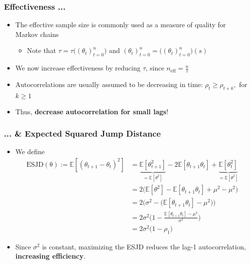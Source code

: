 \begin{frame}[c]
    \frametitle{Effectiveness ...}
    \begin{itemize}
        \item The effective sample size is commonly used as a measure of quality for Markov chains
        \begin{itemize}
            \item Note that $\tau = \tau\big((\theta_t)_{t=0}^n\big)$ and $(\theta_t)_{t=0}^n = \big((\theta_t)_{t=0}^n\big)(s)$
        \end{itemize}
        \item We now increase effectiveness by reducing $\tau$, since $n_\mathrm{eff} = \frac{n}{\tau}$
        \item Autocorrelations are usually assumed to be decreasing in time: $\rho_t \geq \rho_{t+k},$ for $k \geq 1$
        \item Thus, \textbf{decrease autocorrelation for small lags}!
    \end{itemize}
\end{frame}

\begin{frame}[c]
    \frametitle{... \& Expected Squared Jump Distance}
    \begin{itemize}
        \item We define
        \begin{align*}
            \mathrm{ESJD(\theta)} := \mathbb{E}[(\theta_{t+1} - \theta_t)^2] 
                &= \underbrace{\mathbb{E}[\theta_{t+1}^2]}_{=\mathbb{E}[\theta^2]} - 2\mathbb{E}[\theta_{t+1}\theta_t] + \underbrace{\mathbb{E}[\theta_t^2]}_{=\mathbb{E}[\theta^2]} \\
                &= 2\big(\mathbb{E}[\theta^2] - \mathbb{E}[\theta_{t+1}\theta_t]  + \mu^2 - \mu^2\big)\\
                &= 2\big(\sigma^2 - \big(\mathbb{E}[\theta_{t+1}\theta_t]  - \mu^2\big)\big)\\
                &= 2\sigma^2\big(1 - \frac{\mathbb{E}[\theta_{t+1}\theta_t]  - \mu^2}{\sigma^2}\big)\\
                &= 2\sigma^2\big(1 - \rho_1\big)
        \end{align*}
        \item Since $\sigma^2$ is constant, maximizing the ESJD reduces the lag-1 autocorrelation, \textbf{increasing efficiency}.
    \end{itemize}
\end{frame}

